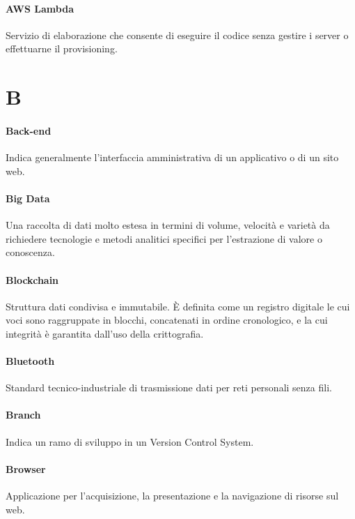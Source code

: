 \documentclass[]{article}
\begin{document}
	\paragraph*{AWS Lambda}
	Servizio di elaborazione che consente di eseguire il codice senza gestire i server o effettuarne il provisioning.
	
	\newpage
	
	
	\section*{B}
	
	\paragraph*{Back-end}
	Indica generalmente l'interfaccia amministrativa di un applicativo o di un sito web.
	
	\paragraph*{Big Data}
	Una raccolta di dati molto estesa in termini di	volume, velocità e varietà da richiedere tecnologie e metodi analitici specifici per l'estrazione di valore o conoscenza.
	
	\paragraph*{Blockchain}
	Struttura dati condivisa e immutabile. È definita come un registro digitale le cui voci sono raggruppate in blocchi, concatenati in ordine cronologico, e la cui integrità è garantita dall'uso della crittografia.
	
	\paragraph*{Bluetooth}
	Standard tecnico-industriale di trasmissione dati per reti personali senza fili.
	
	\paragraph*{Branch}
	Indica un ramo di sviluppo in un Version Control System.
	
	\paragraph*{Browser}
	Applicazione per l'acquisizione, la presentazione e la navigazione di risorse sul web.
	
\end{document}
